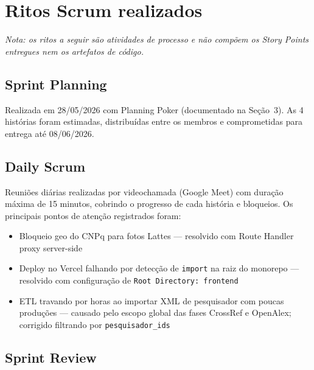 \documentclass[12pt,a4paper]{article}
\begin{document}
\section{Ritos Scrum realizados}

\noindent\textit{Nota: os ritos a seguir são atividades de processo e não compõem os Story Points
entregues nem os artefatos de código.}

\subsection{Sprint Planning}

Realizada em 28/05/2026 com Planning Poker (documentado na Seção~3). As 4 histórias foram estimadas,
distribuídas entre os membros e comprometidas para entrega até 08/06/2026.

\subsection{Daily Scrum}

Reuniões diárias realizadas por videochamada (Google Meet) com duração máxima de 15 minutos, cobrindo
o progresso de cada história e bloqueios. Os principais pontos de atenção registrados foram:
\begin{itemize}[noitemsep]
  \item Bloqueio geo do CNPq para fotos Lattes — resolvido com Route Handler proxy server-side
  \item Deploy no Vercel falhando por detecção de \texttt{import} na raiz do monorepo — resolvido
        com configuração de \texttt{Root Directory: frontend}
  \item ETL travando por horas ao importar XML de pesquisador com poucas produções — causado pelo
        escopo global das fases CrossRef e OpenAlex; corrigido filtrando por \texttt{pesquisador\_ids}
\end{itemize}

\subsection{Sprint Review}
\end{document}
